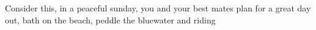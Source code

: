 Consider this, in a peaceful sunday, you and your best mates plan for a great day out, bath on the beach, peddle the bluewater and riding 